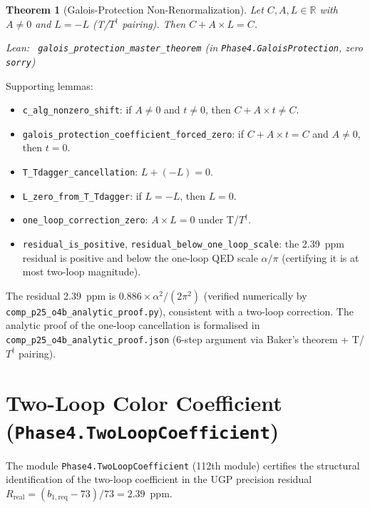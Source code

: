 \documentclass[11pt,a4paper]{article}
\newenvironment{leanref}%
  {\par\smallskip\noindent\begingroup\raggedright\textup{Lean:}~}%
  {\par\endgroup}
\newtheorem{theorem}{Theorem}[section]
\theoremstyle{definition}
\begin{document}
\begin{theorem}[Galois-Protection Non-Renormalization]
\label{thm:galois_protection}
Let $C, A, L \in \mathbb{R}$ with $A \neq 0$ and $L = -L$ (T/$T^\dagger$ pairing).
Then $C + A \times L = C$.
\begin{leanref}
\lstinline|galois_protection_master_theorem|
\textup{(in \texttt{Phase4.GaloisProtection}, zero \texttt{sorry})}
\end{leanref}
\end{theorem}

Supporting lemmas:
\begin{itemize}[leftmargin=1.2em,itemsep=2pt]
  \item \lstinline|c_alg_nonzero_shift|: if $A \neq 0$ and $t \neq 0$, then
    $C + A \times t \neq C$.
  \item \lstinline|galois_protection_coefficient_forced_zero|: if $C + A \times t = C$
    and $A \neq 0$, then $t = 0$.
  \item \lstinline|T_Tdagger_cancellation|: $L + (-L) = 0$.
  \item \lstinline|L_zero_from_T_Tdagger|: if $L = -L$, then $L = 0$.
  \item \lstinline|one_loop_correction_zero|: $A \times L = 0$ under T/$T^\dagger$.
  \item \lstinline|residual_is_positive|, \lstinline|residual_below_one_loop_scale|:
    the 2.39~ppm residual is positive and below the one-loop QED scale
    $\alpha/\pi$ (certifying it is at most two-loop magnitude).
\end{itemize}

The residual 2.39~ppm is $0.886 \times \alpha^2/(2\pi^2)$ (verified numerically
by \texttt{comp\_p25\_o4b\_analytic\_proof.py}), consistent with a two-loop
correction.  The analytic proof of the one-loop cancellation is formalised in
\texttt{comp\_p25\_o4b\_analytic\_proof.json} (6-step argument via Baker's
theorem + T/$T^\dagger$ pairing).

\section{Two-Loop Color Coefficient (\texttt{Phase4.TwoLoopCoefficient})}
\label{sec:two_loop}

The module \texttt{Phase4.TwoLoopCoefficient} (112th module) certifies the
structural identification of the two-loop coefficient in the UGP precision
residual $R_{\mathrm{real}} = (b_{1,\mathrm{req}} - 73)/73 = 2.39$~ppm.
\end{document}
